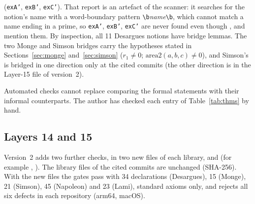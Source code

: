 \documentclass[11pt]{article}
\theoremstyle{definition}
\theoremstyle{remark}
\newcommand{\lean}[1]{\texttt{#1}}
\begin{document}
\begin{itemize}
(\lean{exA'}, \lean{exB'}, \lean{exC'}). That report is an artefact of the scanner: it searches
for the notion's name with a word-boundary pattern \lean{\textbackslash b}\emph{name}\lean{\textbackslash b},
which cannot match a name ending in a prime, so \lean{exA'}, \lean{exB'}, \lean{exC'} are never
found even though ,  and
 mention them. By inspection, all 11 Desargues notions have
bridge lemmas. The two Monge and Simson bridges carry the hypotheses stated in
Sections~\ref{sec:monge} and~\ref{sec:simson} ($r_1\ne0$; $\mathrm{area2}(a,b,c)\ne0$), and
Simson's  is bridged in one direction only at the cited commits (the other
direction is in the Layer-15 file of version~2).
\end{itemize}
Automated checks cannot replace comparing the formal statements with their informal counterparts.
The author has checked each entry of Table~\ref{tab:thms} by hand.

\subsection{Layers 14 and 15}\label{sec:l1415}

Version~2 adds two further checks, in two new files of each library,  and
 (for example , ).
The library files of the cited commits are unchanged (SHA-256). With the new files the gates pass
with 34 declarations (Desargues), 15 (Monge), 21 (Simson), 45 (Napoleon) and 23 (Lami), standard
axioms only, and  rejects all six defects in each repository (arm64, macOS).
\end{document}
